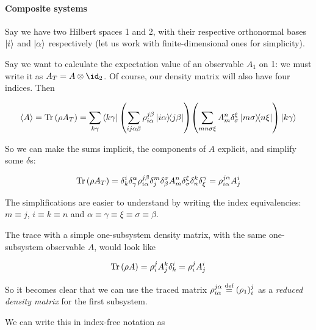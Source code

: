 \documentclass[main.tex]{subfiles}
\begin{document}
\paragraph{Composite systems}

Say we have two Hilbert spaces 1 and 2, with their respective orthonormal bases \(\ket{i} \) and \(\ket{\alpha} \) respectively (let us work with finite-dimensional ones for simplicity).

Say we want to calculate the expectation value of an observable \(A_1\) on 1: we must write it as \(A_T = A \otimes \id_2\).
Of course, our density matrix will also have four indices.
Then

\begin{equation}
    \expval{A} = \operatorname*{Tr} \qty(\rho A_T)
    = \sum _{k \gamma} \bra{k \gamma}
    \qty(\sum _{ij \alpha \beta} \rho_{i \alpha}^{j \beta}  \ketbra{i \alpha}{j \beta})
    \qty(\sum_{mn \sigma \xi} A_m^n \delta_ \sigma^ \xi \ketbra{m \sigma}{n \xi})
    \ket{k \gamma}
\end{equation}

So we can make the sums implicit,  the components of \(A\) explicit, and simplify some \(\delta\)s:

\begin{equation}
    \operatorname*{Tr} \qty(\rho A_T)
    = \delta_k^i \delta_\gamma ^\alpha
    \rho_{i \alpha}^{j \beta}
    \delta_j ^m \delta_\beta^\sigma
    A_m^n \delta_ \sigma^ \xi
    \delta_n^k \delta_\xi^\gamma
    = \rho_{i \alpha}^{j \alpha} A_j^i
\end{equation}

The simplifications are easier to understand by writing the index equivalencies:
\(m \equiv j\), \(i \equiv k \equiv n\) and \(\alpha \equiv \gamma \equiv \xi \equiv \sigma \equiv \beta\).

The trace with a simple one-subsystem density matrix, with the same one-subsystem observable \(A\), would look like

\begin{equation}
    \operatorname*{Tr} \qty(\rho A) = \rho_i ^j A_j^k \delta_k ^i = \rho_i^j A_j^i
\end{equation}

So it becomes clear that we can use the traced matrix \(\rho_{i \alpha}^{j \alpha} \stackrel{\text{def}}{=} (\rho_1)_i^j\) as a \emph{reduced density matrix} for the first subsystem.

We can write this in index-free notation as
\end{document}
